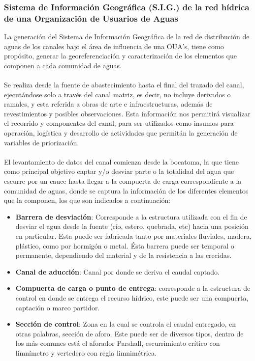 \documentclass[]{article}
\begin{document}
\subsubsection{Sistema de Información Geográfica (S.I.G.) de la red hídrica de una Organización de Usuarios de Aguas}

La generación del Sistema de Información Geográfica de la red de distribución de aguas de los canales bajo el área de influencia de una OUA's, tiene como propósito, generar la georeferenciación y caracterización de los elementos que componen a cada comunidad de aguas.\\
\\
Se realiza desde la fuente de abastecimiento hasta el final del trazado del canal, ejecutándose solo a través del canal matriz, es decir, no incluye derivados o ramales, y esta referida a obras de arte e infraestructuras, además de revestimientos y posibles observaciones. Esta información nos permitirá visualizar el recorrido y componentes del canal, para ser utilizados como insumos para operación, logística y desarrollo de actividades que permitán la generación de variables de priorización.\\
\\
El levantamiento de datos del canal comienza desde la bocatoma, la que tiene como principal objetivo captar y/o desviar parte o la totalidad del agua que escurre por un cauce hasta llegar a la compuerta de carga correspondiente a la comunidad de aguas, donde se captura la información de los diferentes elementos que la componen, los que son indicados a continuación:

\begin{itemize}
\item{\bfseries {Barrera de desviación}}: Corresponde a la estructura utilizada con el fin de desviar el agua desde la fuente (río, estero, quebrada, etc) hacia una posición en particular. Esta puede ser fabricada tanto por materiales fluviales, madera, plástico, como por hormigón o metal. Ésta barrera puede ser temporal o permanente, dependiendo del material y de la resistencia a las crecidas.
\item{\bfseries {Canal de aducción}}: Canal por donde se deriva el caudal captado.
\item{\bfseries {Compuerta de carga o punto de entrega}}: corresponde a la estructura de control en donde se entrega el recurso hídrico, este puede ser una compuerta, captación o marco partidor.
\item{\bfseries {Sección de control}}: Zona en la cual se controla el caudal entregado, en otras palabras, sección de aforo. Este puede ser de diversos tipos, dentro de los más comunes está el aforador Parshall, escurrimiento crítico con limnímetro y vertedero con regla limnimétrica.
\end{itemize}
\end{document}
